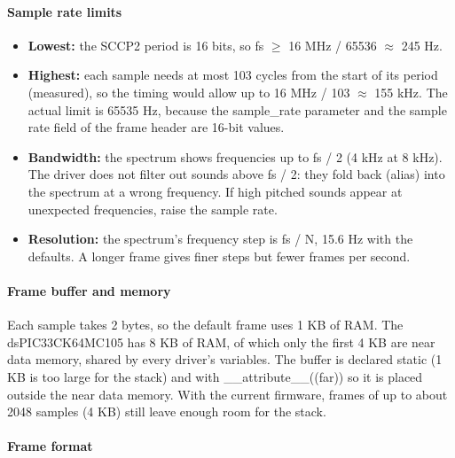 \documentclass[
  11pt,
  letterpaper,
  oneside,
  DIV=13,               %
  parskip=half,          %
  headings=normal,
  chapterprefix=false,
  toc=listof,
  numbers=noenddot,
]{scrbook}
\begin{document}
\paragraph{Sample rate limits}
\begin{itemize}
\item \textbf{Lowest: }the SCCP2 period is 16 bits, so fs $\geq$ 16 MHz / 65536 $\approx$ 245 Hz.
\item \textbf{Highest: }each sample needs at most 103 cycles from the start of its period (measured), so the timing would allow up to 16 MHz / 103 $\approx$ 155 kHz. The actual limit is 65535 Hz, because the sample\_rate parameter and the sample rate field of the frame header are 16-bit values.
\item \textbf{Bandwidth: }the spectrum shows frequencies up to fs / 2 (4 kHz at 8 kHz). The driver does not filter out sounds above fs / 2: they fold back (alias) into the spectrum at a wrong frequency. If high pitched sounds appear at unexpected frequencies, raise the sample rate.
\item \textbf{Resolution: }the spectrum's frequency step is fs / N, 15.6 Hz with the defaults. A longer frame gives finer steps but fewer frames per second.
\end{itemize}

\paragraph{Frame buffer and memory}

Each sample takes 2 bytes, so the default frame uses 1 KB of RAM. The dsPIC33CK64MC105 has 8 KB of RAM, of which only the first 4 KB are near data memory, shared by every driver's variables. The buffer is declared static (1 KB is too large for the stack) and with \_\_attribute\_\_((far)) so it is placed outside the near data memory. With the current firmware, frames of up to about 2048 samples (4 KB) still leave enough room for the stack.

\paragraph{Frame format}
\end{document}
